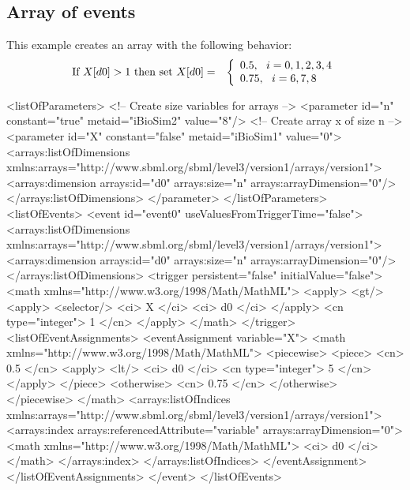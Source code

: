\subsection{Array of events}

This example creates an \Event array with the following behavior:
\begin{eqnarray*}
\textup{If }X[d0] > 1\textup{ then set }X[d0] & = & \left\{ \begin{array}{l}
0.5,~~i = 0, 1, 2, 3, 4 \\
0.75,~~i = 6, 7, 8
\end{array}
\right.
\end{eqnarray*}

\begin{example}
<listOfParameters>
    <!-- Create size variables for arrays -->
    <parameter id="n" constant="true" metaid="iBioSim2" value="8"/>
    <!-- Create array x of size n -->
    <parameter id="X" constant="false" metaid="iBioSim1" value="0">
        <arrays:listOfDimensions
            xmlns:arrays="http://www.sbml.org/sbml/level3/version1/arrays/version1">
            <arrays:dimension arrays:id="d0" arrays:size="n" arrays:arrayDimension="0"/>
        </arrays:listOfDimensions>
    </parameter>
</listOfParameters>
<listOfEvents>
    <event id="event0" useValuesFromTriggerTime="false">
        <arrays:listOfDimensions
            xmlns:arrays="http://www.sbml.org/sbml/level3/version1/arrays/version1">
            <arrays:dimension arrays:id="d0" arrays:size="n" arrays:arrayDimension="0"/>
        </arrays:listOfDimensions>
        <trigger persistent="false" initialValue="false">
            <math xmlns="http://www.w3.org/1998/Math/MathML">
                <apply>
                    <gt/>
                    <apply>
                        <selector/>
                        <ci> X </ci>
                        <ci> d0 </ci>
                    </apply>
                    <cn type="integer"> 1 </cn>
                </apply>
            </math>
        </trigger>
        <listOfEventAssignments>
            <eventAssignment variable="X">
                <math xmlns="http://www.w3.org/1998/Math/MathML">
                    <piecewise>
                        <piece>
                            <cn> 0.5 </cn>
                            <apply>
                                <lt/>
                                <ci> d0 </ci>
                                <cn type="integer"> 5 </cn>
                            </apply>
                        </piece>
                        <otherwise>
                            <cn> 0.75 </cn>
                        </otherwise>
                    </piecewise>
                </math>
                <arrays:listOfIndices
                    xmlns:arrays="http://www.sbml.org/sbml/level3/version1/arrays/version1">
                    <arrays:index arrays:referencedAttribute="variable" arrays:arrayDimension="0">
                        <math
                            xmlns="http://www.w3.org/1998/Math/MathML">
                            <ci> d0 </ci>
                        </math>
                    </arrays:index>
                </arrays:listOfIndices>
            </eventAssignment>
        </listOfEventAssignments>
    </event>
</listOfEvents>
\end{example}


